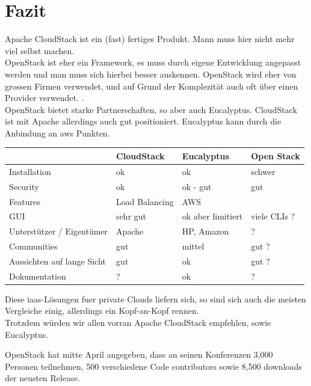 \documentclass[a4paper,nochapterprefix,english,12pt]{scrreprt}
\begin{document}
\chapter{Fazit} \thispagestyle{fancy}
Apache CloudStack ist ein (fast) fertiges Produkt. Mann muss hier nicht mehr viel selbst machen.\\
OpenStack ist eher ein Framework, es muss durch eigene Entwicklung angepasst werden und man muss sich hierbei besser auskennen.\cite{OSundAVerg} OpenStack wird eher von grossen Firmen verwendet, und auf Grund der Komplezität auch oft über einen Provider verwendet. \cite{allthreeverg}. \\
OpenStack bietet starke Partnerschaften, so aber auch Eucalyptus. CloudStack ist mit Apache allerdings auch gut positioniert. Eucalyptus kann durch die Anbindung an \gls{aws} Punkten.
\begin{table}[h]
\begin{tabular}{|p{}|p{}|p{}|p{}|}
\hline
 & \textbf{CloudStack} & \textbf{Eucalyptus} & \textbf{Open Stack} \\ \hline
Installation  &  ok  & ok & schwer   \\
Security  & ok & ok - gut &         gut            \\ 
Features & Load Balancing  & AWS &                     \\ 
GUI  &  sehr gut  & ok aber limitiert&         viele CLIs  ?          \\ 
Unterstützer / Eigentümer  & Apache & HP, Amazon &       ?           \\ 
Communities  & gut & mittel &       gut   ?        \\ 
Aussichten auf lange Sicht  & gut & ok &       gut ?          \\ 
Dokumentation & ? & ok &       ?          \\ 
\hline
\end{tabular}
\end{table}
Diese \gls{iaas}-Lösungen fuer private Clouds liefern sich, so sind sich auch die meisten Vergleiche einig, allerdings ein Kopf-an-Kopf rennen. \\
Trotzdem würden wir allen vorran Apache CloudStack empfehlen, sowie Eucalyptus. \cite{allthreeverg}




OpenStack hat mitte April angegeben, dass an seinen Konferenzen 3,000 Personen teilnehmen, 500 verschiedene Code contributors sowie 8,500 downloads der neusten Release.



 


 \thispagestyle{fancy}
 \thispagestyle{fancy}

\listoffigures \thispagestyle{fancy}

\printglossary[style=tree,title={Glossar}]  \thispagestyle{fancy}

\label{lastpage}
\end{document}
